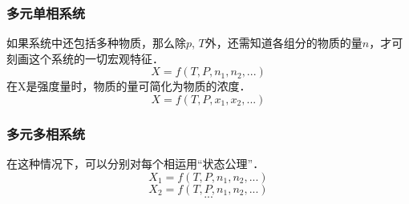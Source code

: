 \subsubsection{多元单相系统}
如果系统中还包括多种物质，那么除$p$, $T$外，还需知道各组分的物质的量$n$，才可刻画这个系统的一切宏观特征．
\begin{equation}
X=f(T,P,n_1, n_2, ...)
\end{equation}
在X是强度量时，物质的量可简化为物质的浓度．
\begin{equation}
X=f(T,P,x_1, x_2, ...)
\end{equation}

\subsubsection{多元多相系统}
在这种情况下，可以分别对每个相运用“状态公理”．
\begin{equation}
X_1=f(T,P,n_1, n_2, ...)
\end{equation}
\begin{equation}
X_2=f(T,P,n_1, n_2, ...)
\end{equation}
$$...$$
